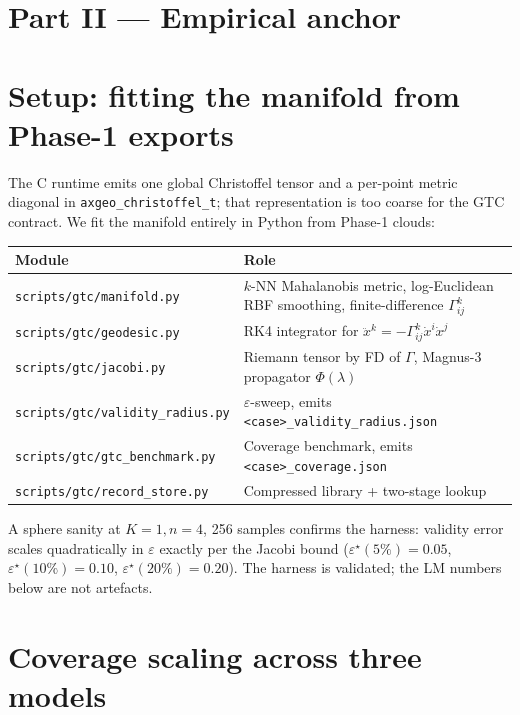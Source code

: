 \documentclass[11pt]{article}
\begin{document}
\section*{Part II --- Empirical anchor}

\section{Setup: fitting the manifold from Phase-1 exports}
\label{sec:setup}

The C runtime emits one global Christoffel tensor and a per-point metric
diagonal in \texttt{axgeo\_christoffel\_t}; that representation is too coarse
for the GTC contract. We fit the manifold entirely in Python from Phase-1
clouds:

\begin{center}\small
\begin{tabularx}{\linewidth}{lX}
\toprule
\textbf{Module} & \textbf{Role}\\
\midrule
\texttt{scripts/gtc/manifold.py}      & $k$-NN Mahalanobis metric, log-Euclidean RBF smoothing, finite-difference $\Gamma^k_{ij}$\\
\texttt{scripts/gtc/geodesic.py}      & RK4 integrator for $\ddot x^k = -\Gamma^k_{ij}\dot x^i \dot x^j$\\
\texttt{scripts/gtc/jacobi.py}        & Riemann tensor by FD of $\Gamma$, Magnus-3 propagator $\Phi(\lambda)$\\
\texttt{scripts/gtc/validity\_radius.py} & $\varepsilon$-sweep, emits \texttt{<case>\_validity\_radius.json}\\
\texttt{scripts/gtc/gtc\_benchmark.py} & Coverage benchmark, emits \texttt{<case>\_coverage.json}\\
\texttt{scripts/gtc/record\_store.py} & Compressed library + two-stage lookup\\
\bottomrule
\end{tabularx}
\end{center}

A sphere sanity at $K=1, n=4$, 256 samples confirms the harness: validity
error scales quadratically in $\varepsilon$ exactly per the Jacobi bound
($\varepsilon^\star(5\%)=0.05$, $\varepsilon^\star(10\%)=0.10$,
$\varepsilon^\star(20\%)=0.20$). The harness is validated; the LM numbers
below are not artefacts.

\section{Coverage scaling across three models}
\label{sec:coverage}
\end{document}
